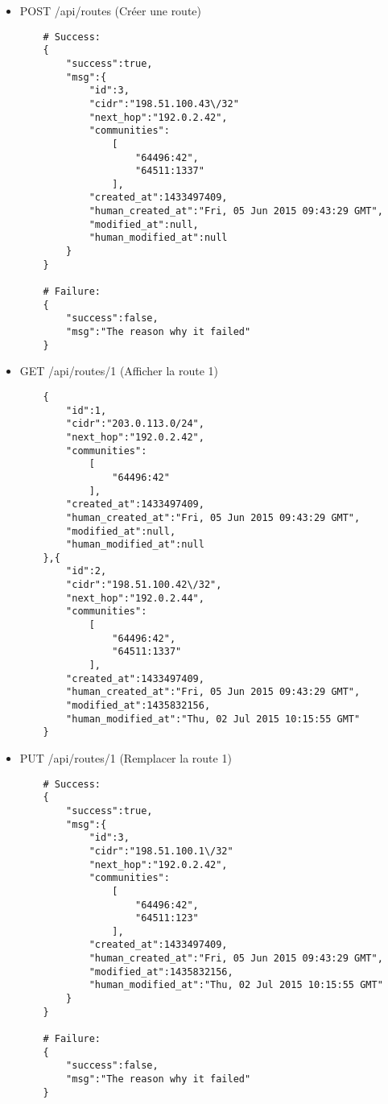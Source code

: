 \begin{itemize}
    \item POST /api/routes (Créer une route)
    \begin{verbatim}
    # Success:
    {
        "success":true,
        "msg":{
            "id":3,
            "cidr":"198.51.100.43\/32"
            "next_hop":"192.0.2.42",
            "communities":
                [
                    "64496:42",
                    "64511:1337"
                ],
            "created_at":1433497409,
            "human_created_at":"Fri, 05 Jun 2015 09:43:29 GMT",
            "modified_at":null,
            "human_modified_at":null
        }
    }

    # Failure:
    {
        "success":false,
        "msg":"The reason why it failed"
    }
    \end{verbatim}

    \item GET /api/routes/1 (Afficher la route 1)
    \begin{verbatim}
    {
        "id":1,
        "cidr":"203.0.113.0/24",
        "next_hop":"192.0.2.42",
        "communities":
            [
                "64496:42"
            ],
        "created_at":1433497409,
        "human_created_at":"Fri, 05 Jun 2015 09:43:29 GMT",
        "modified_at":null,
        "human_modified_at":null
    },{
        "id":2,
        "cidr":"198.51.100.42\/32",
        "next_hop":"192.0.2.44",
        "communities":
            [
                "64496:42",
                "64511:1337"
            ],
        "created_at":1433497409,
        "human_created_at":"Fri, 05 Jun 2015 09:43:29 GMT",
        "modified_at":1435832156,
        "human_modified_at":"Thu, 02 Jul 2015 10:15:55 GMT"
    }
    \end{verbatim}

    \item PUT /api/routes/1 (Remplacer la route 1)
    \begin{verbatim}
    # Success:
    {
        "success":true,
        "msg":{
            "id":3,
            "cidr":"198.51.100.1\/32"
            "next_hop":"192.0.2.42",
            "communities":
                [
                    "64496:42",
                    "64511:123"
                ],
            "created_at":1433497409,
            "human_created_at":"Fri, 05 Jun 2015 09:43:29 GMT",
            "modified_at":1435832156,
            "human_modified_at":"Thu, 02 Jul 2015 10:15:55 GMT"
        }
    }

    # Failure:
    {
        "success":false,
        "msg":"The reason why it failed"
    }
    \end{verbatim}


\end{itemize}
